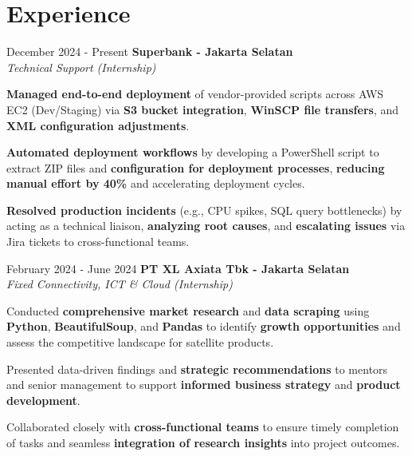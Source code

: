 \documentclass[../main.tex]{subfiles}
\begin{document}
\section{Experience}

\begin{twocolentry}{December 2024 - Present}
    \textbf{Superbank \color{Gray}- Jakarta Selatan}\\
    \textit{Technical Support (Internship)}
\end{twocolentry}

\vspace{0.10 cm}
\begin{onecolentry}
\begin{highlights}
    \item \textbf{Managed end-to-end deployment} of vendor-provided scripts across AWS EC2 (Dev/Staging) via \textbf{S3 bucket integration}, \textbf{WinSCP file transfers}, and \textbf{XML configuration adjustments}.
    \item \textbf{Automated deployment workflows} by developing a PowerShell script to extract ZIP files and \textbf{configuration for deployment processes}, \textbf{reducing manual effort by 40\%} and accelerating deployment cycles.
    \item \textbf{Resolved production incidents} (e.g., CPU spikes, SQL query bottlenecks) by acting as a technical liaison, \textbf{analyzing root causes}, and \textbf{escalating issues} via Jira tickets to cross-functional teams.
\end{highlights}
\end{onecolentry}

\vspace{0.40 cm}

\begin{twocolentry}{February 2024 - June 2024}
    \textbf{PT XL Axiata Tbk \color{Gray}- Jakarta Selatan}\\
    \textit{Fixed Connectivity, ICT \& Cloud (Internship)}
\end{twocolentry}

\vspace{0.10 cm}
\begin{onecolentry}
\begin{highlights}
    \item Conducted \textbf{comprehensive market research} and \textbf{data scraping} using \textbf{Python}, \textbf{BeautifulSoup}, and \textbf{Pandas} to identify \textbf{growth opportunities} and assess the competitive landscape for satellite products.
    \item Presented data-driven findings and \textbf{strategic recommendations} to mentors and senior management to support \textbf{informed business strategy} and \textbf{product development}.
    \item Collaborated closely with \textbf{cross-functional teams} to ensure timely completion of tasks and seamless \textbf{integration of research insights} into project outcomes.
\end{highlights}
\end{onecolentry}
\end{document}
